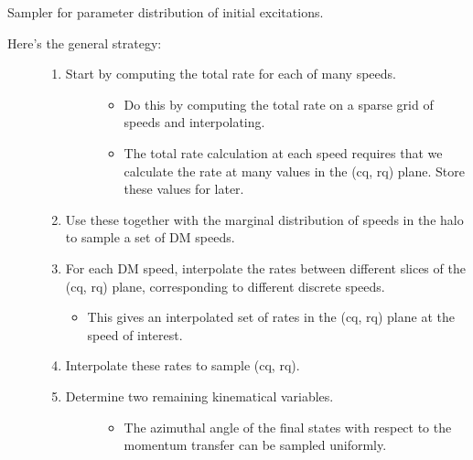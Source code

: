 \documentclass[letterpaper,10pt,english]{sphinxmanual}
\begin{document}
\begin{fulllineitems}
\label{\detokenize{code_structure:scdc.initial.distribution.integral.InitialSampler}}
Sampler for parameter distribution of initial excitations.
\begin{description}
\item[{Here’s the general strategy:}] \leavevmode\begin{enumerate}
%
\item {} \begin{description}
\item[{Start by computing the total rate for each of many speeds.}] \leavevmode\begin{itemize}
\item {} 
Do this by computing the total rate on a sparse grid of speeds
and interpolating.

\item {} 
The total rate calculation at each speed requires that we
calculate the rate at many values in the (cq, rq) plane. Store
these values for later.

\end{itemize}

\end{description}

\item {} 
Use these together with the marginal distribution of speeds in the
halo to sample a set of DM speeds.

\item {} 
For each DM speed, interpolate the rates between different slices of
the (cq, rq) plane, corresponding to different discrete speeds.
\begin{itemize}
\item {} 
This gives an interpolated set of rates in the (cq, rq) plane at
the speed of interest.

\end{itemize}

\item {} 
Interpolate these rates to sample (cq, rq).

\item {} \begin{description}
\item[{Determine two remaining kinematical variables.}] \leavevmode\begin{itemize}
\item {} 
The azimuthal angle of the final states with respect to the
momentum transfer can be sampled uniformly.


\end{itemize}
\end{description}
\end{enumerate}
\end{description}
\end{fulllineitems}
\end{document}
